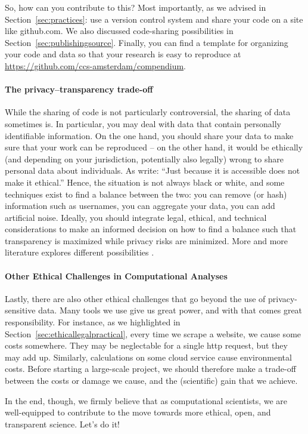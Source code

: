 So, how can you contribute to this? Most importantly, as we advised in Section~\ref{sec:practices}: use a version control system
and share your code on a site like github.com. We also discussed code-sharing possibilities in Section~\ref{sec:publishingsource}. Finally, you can find a template for organizing your code and data so that your
research is easy to reproduce at \url{https://github.com/ccs-amsterdam/compendium}.

\paragraph{The privacy--transparency trade-off} While the sharing of code is not particularly controversial, the sharing of
data sometimes is. In particular, you may deal with data that contain personally identifiable information. On the one
hand, you should share your data to make sure that your work can be reproduced -- on the other hand, it would be ethically
(and depending on your jurisdiction, potentially also legally) wrong to share personal data about individuals.
As \cite{boyd2012} write: ``Just because it is accessible does not make it ethical.'' Hence, the
situation is not always black or white, and some techniques exist to find a balance between the two: you can remove
(or hash) information such as usernames, you can aggregate your data, you can add artificial noise. Ideally, you should
integrate legal, ethical, and technical considerations to make an informed decision on how to find a balance such that
transparency is maximized while privacy risks are minimized. More and more literature explores different possibilities \cite[e.g.][]{Breuer2020}.


\paragraph{Other Ethical Challenges in Computational Analyses}
Lastly, there are also other ethical challenges that go beyond the use of privacy-sensitive data. Many tools we
use give us great power, and with that comes great responsibility. For instance, as we highlighted in
Section~\ref{sec:ethicallegalpractical}, every time we scrape a website, we cause some costs somewhere. They may be
neglectable for a single http request, but they may add up. Similarly, calculations on some cloud service
cause environmental costs. Before starting a large-scale project, we should therefore make a trade-off between
the costs or damage we cause, and the (scientific) gain that we achieve.

In the end, though, we firmly believe that as computational scientists, we are well-equipped to contribute to the move towards
more ethical, open, and transparent science. Let's do it!
